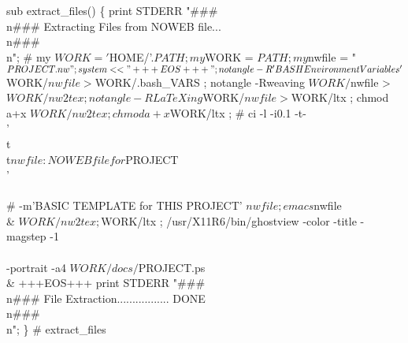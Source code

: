 \documentclass[11pt]{article}
\def\nwendcode{\endtrivlist \endgroup} %
\let\nwdocspar=\par                    %
\begin{document}
\nwenddocs{}\plusendmoddef
sub extract_files() \{
    print STDERR "###\\n### Extracting Files from NOWEB file...\\n###\\n";
    # my $WORK = '$HOME/'.$PATH;
    my $WORK = $PATH;
    my $nwfile = "$PROJECT.nw";
    system << "+++EOS+++" ;
notangle -R\\'BASH Environment Variables\\' $WORK/$nwfile > $WORK/.bash_VARS ; 
notangle -Rweaving  $WORK/$nwfile > $WORK/nw2tex ;
notangle -RLaTeXing $WORK/$nwfile > $WORK/ltx ;
chmod a+x $WORK/nw2tex ;
chmod a+x $WORK/ltx ;
# ci -l -i0.1 -t-\\'\\t\\t$nwfile: NOWEB file for $PROJECT\\' \\\\
#    -m'BASIC TEMPLATE for THIS PROJECT' $nwfile ;
emacs $nwfile \\&
$WORK/nw2tex ;
$WORK/ltx ;
/usr/X11R6/bin/ghostview -color -title -magstep -1 \\\\
                         -portrait -a4 $WORK/docs/$PROJECT.ps \\&
+++EOS+++
    print STDERR "###\\n### File Extraction................. DONE\\n###\\n";
\} # extract_files
\nwendcode{}\nwdocspar

\label{todo:DDD}
\nwenddocs{}%
%
\nwdocspar
\nwenddocs{}%
%
\nwdocspar
\todo{ \item \todoDDD } %

\newpage %


\label{todo:BAA}\label{todo:BAB}\label{todo:BAC}
\nwenddocs{}%
%
%
%
\nwdocspar
\nwenddocs{}%
%
%
%
\nwdocspar
\todo{ 
 \item \todoBAA
 \item \todoBAB
 \item \todoBAC
 } %

\end{document}

